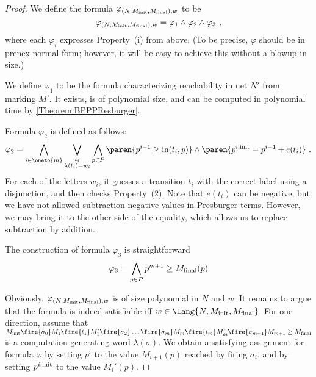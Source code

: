 \documentclass[../../diss.tex]{subfiles}
\begin{document}
\begin{proof}
    We define the formula $\varphi_{(N,M_{\text{init}},M_{\text{final}}),w}$ to be
    \[
        \varphi_{(N,M_{\text{init}},M_{\text{final}}),w} = \varphi_1 \wedge \varphi_2 \wedge \varphi_3
        \ ,
    \]
    where each $\varphi_i$ expresses Property~(i) from above.
    (To be precise, $\varphi$ should be in prenex normal form; however, it will be easy to achieve this without a blowup in size.)

    We define $\varphi_1$ to be the formula characterizing reachability in net $N'$ from marking $M'$.
    It exists, is of polynomial size, and can be computed in polynomial time by \cref{Theorem:BPPPResburger}.

    Formula $\varphi_2$ is defined as follows:
    \[
        \varphi_2 =
        \bigwedge_{i \in \oneto{m}}
        \bigvee_{\substack{t_i\\\lambda(t_i) = w_i}}
        \bigwedge_{p \in P}
            \paren {p^{i-1} \geq \i(t_i,p)}
            \wedge
            \paren {p^{i,\init} = p^{i-1} + e(t_i)}
        \ .
    \]
    For each of the letters $w_i$, it guesses a transition $t_i$ with the correct label using a disjunction, and then checks Property~(2).
    Note that $e(t_i)$ can be negative, but we have not allowed subtraction \resp negative values in Presburger terms.
    However, we may bring it to the other side of the equality, which allows us to replace subtraction by addition.

    The construction of formula $\varphi_3$ is straightforward
    \[
        \varphi_3 = \bigwedge_{p \in P} p^{m+1} \geq M_{\text{final}}(p)
    \]

    Obviously, $\varphi_{(N,M_{\text{init}},M_{\text{final}}),w}$ is of size polynomial in $N$ and $w$.
    It remains to argue that the formula is indeed satisfiable iff $w \in \lang{N,\Minit,\Mfinal}$.
    For one direction, assume that
    \(
        \Minit \fire{\sigma_0} M_1 \fire{t_1} M_1' \fire{\sigma_2} \ldots \fire{\sigma_m} M_m \fire{t_m} M_m' \fire{\sigma_{m+1}} M_{m+1} \geq \Mfinal
    \)
    is a computation generating word $\lambda(\sigma)$.
    We obtain a satisfying assignment for formula $\varphi$ by setting $p^i$ to the value $M_{i+1}(p)$ reached by firing $\sigma_i$, and by setting $p^{i,{\text{init}}}$ to the  value $M_i'(p)$.



\end{proof}
\end{document}
